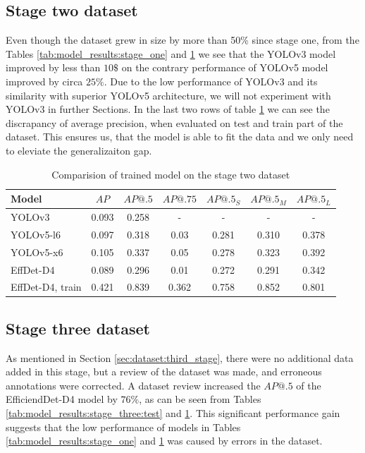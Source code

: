 \subsection{Stage two dataset}
Even though the dataset grew in size by more than 50\% since stage one, from the Tables \ref{tab:model_results:stage_one} and \ref{tab:model_results:stage_two} we see that the YOLOv3 model improved by less than $10\$$ on the contrary performance of YOLOv5 model improved by circa $25\%$. Due to the low performance of YOLOv3 and its similarity with superior YOLOv5 architecture, we will not experiment with YOLOv3 in further Sections.
In the last two rows of table \ref{tab:model_results:stage_two} we can see the discrapancy of average precision, when evaluated on test and train part of the dataset. This ensures us, that the model is able to fit the data and we only need to eleviate the generalizaiton gap.
\begin{table}[H]
    \centering
    \begin{tabular}{|l|c|c|c|c|c|c|}
        \hline
        Model            & $AP$  & $AP@.5$ & $AP@.75$ & $AP@.5_S$ & $AP@.5_M$ & $AP@.5_L$ \\ \hline
        YOLOv3           & 0.093 & 0.258   & -        & -         & -         & -         \\ \hline
        YOLOv5-l6        & 0.097 & 0.318   & 0.03     & 0.281     & 0.310     & 0.378     \\ \hline
        YOLOv5-x6        & 0.105 & 0.337   & 0.05     & 0.278     & 0.323     & 0.392     \\ \hline
        EffDet-D4        & 0.089 & 0.296   & 0.01     & 0.272     & 0.291     & 0.342     \\ \hline
        EffDet-D4, train & 0.421 & 0.839   & 0.362    & 0.758     & 0.852     & 0.801     \\ \hline
    \end{tabular}
    \caption{Comparision of trained model on the stage two dataset}
    \label{tab:model_results:stage_two}
\end{table}

\subsection{Stage three dataset}
As mentioned in Section \ref{sec:dataset:third_stage}, there were no additional data added in this stage, but a review of the dataset was made, and erroneous annotations were corrected. A dataset review increased the $AP@.5$ of the EfficiendDet-D4 model by $76\%$, as can be seen from Tables \ref{tab:model_results:stage_three:test} and \ref{tab:model_results:stage_two}. This significant performance gain suggests that the low performance of models in Tables \ref{tab:model_results:stage_one} and \ref{tab:model_results:stage_two} was caused by errors in the dataset.

